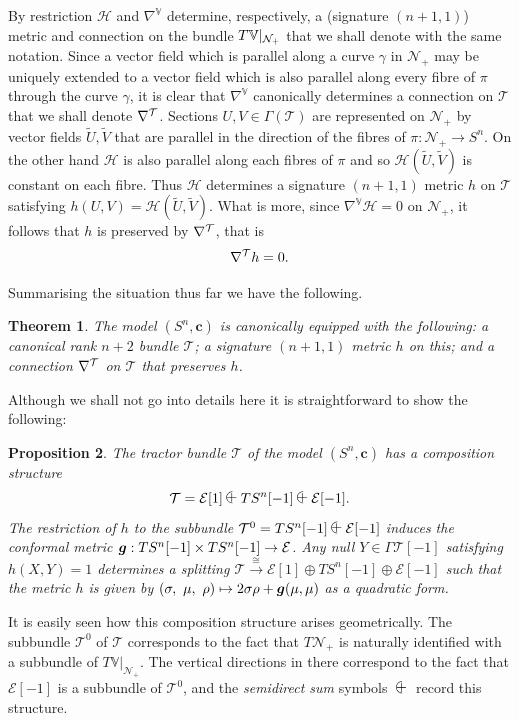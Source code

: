 \documentclass[a4paper,12pt]{amsart}
\def\Cal{\mathcal}
\newcommand{\cc}{\boldsymbol{c}}
\newcommand{\ce}{{\Cal E}}
\newcommand{\cT}{{\mathcal T}}
\def\cH{\mathcal{H}}
\def\cN{\mathcal{N}}
\def\bg{\mbox{\boldmath $g$}}
\newcommand{\lto}{\longrightarrow}
\newcommand{\si}{\sigma}
\newcommand{\lpl}{
  \mbox{$
  \begin{picture}(12.7,8)(-.5,-1)
  \put(2,0.2){$+$}
  \put(6.2,2.8){\oval(8,8)[l]}
  \end{picture}$}}
\newtheorem{theorem}{Theorem}[section]
\newtheorem{proposition}[theorem]{Proposition}
\theoremstyle{remark}
\begin{document}
By restriction $\cH$ and $\nabla^{\mathbb{V}}$ determine,
respectively, a (signature $(n+1,1)$) metric and connection on the
bundle $T\mathbb{V}|_{\mbox{\scriptsize{$\cN_+$}}}$ that we shall denote
with the same notation.  Since a vector field which is parallel along
a curve $\gamma$ in $\cN_+$ may be uniquely extended to a vector field
which is also parallel along every fibre of $\pi$ through the curve
$\gamma$, it is clear that $\nabla^{\mathbb{V}}$ canonically
determines a connection on $\cT$ that we shall denote
$\nabla^{\mbox{\scriptsize{$\cT$}}}$. Sections $U,V\in \Gamma(\cT)$
are represented on $\cN_+$ by vector fields $\tilde{U},\tilde{V}$ that
are parallel in the direction of the fibres of $\pi:\cN_+\to {S^n}$.  On the
other hand $\cH$ is also parallel along each fibres of $\pi$ and so
$\cH(\tilde{U},\tilde{V} )$ is constant on each fibre. Thus $\cH$
determines a signature $(n+1,1)$ metric $h$ on $\cT$ satisfying
$h(U,V)= \cH(\tilde{U},\tilde{V} )$. What is more, since
$\nabla^{\mathbb{V}}\cH=0$ on $\cN_+$, it follows that $h$ is preserved
by $\nabla^{\mbox{\scriptsize{$\cT$}}}$, that is
$$
\nabla^{\mbox{\scriptsize{$\cT$}}} h=0.
$$

Summarising the situation thus far we have the following.  
\begin{theorem}\label{mtr}
The model $({S^n},\cc)$ is canonically equipped with the following:
 a canonical rank $n+2$
bundle $\cT$;  a  signature $(n+1,1)$ metric $h$ on this; and a connection
$\nabla^{\mbox{\scriptsize{$\cT$}}}$ on $\cT$ that preserves $h$.
 \end{theorem}

Although we shall not go into details here it is straightforward to show the following:
\begin{proposition}\label{Tstr}
The tractor bundle $\cT$ of the model $({S^n},\cc)$ has 
a composition structure
\begin{equation}\label{mTcomp}
\cT=\ce[1]\lpl T{S^n}[-1]\lpl \ce[-1].
\end{equation}
The restriction of $h$ to the subbundle $\cT^0= T{S^n}[-1]\lpl \ce[-1]$
induces the conformal metric $\bg: T{S^n}[-1]\times T{S^n}[-1]\to \ce$. 
Any null $Y\in \Gamma{\cT}[-1]$ satisfying $h(X,Y)=1$ determines a 
splitting 
$\cT\stackrel{\cong}{\lto} \ce[1]\oplus
T{S^n}[-1]\oplus \ce[-1]$ such that the metric $h$ is given by $(\si,~\mu,~\rho
)\mapsto 2\si \rho+ \bg(\mu,\mu)$ as a quadratic form.
\end{proposition}
It is easily seen how this composition structure arises
geometrically. The subbundle $\cT^0$ of $\cT$ corresponds to the fact
that $T\cN_+$ is naturally identified with a subbundle of
$T\mathbb{V}|_{\cN_+}$. The vertical directions in there correspond to the fact
that $\ce[-1]$ is a subbundle of $\cT^0$, and the {\em semidirect sum}
symbols $\lpl$ record this structure.
\end{document}
